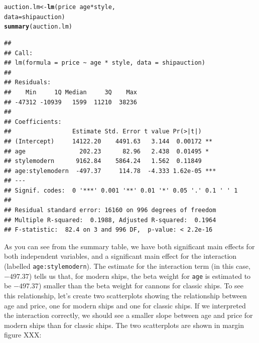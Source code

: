 \documentclass{tufte-book}\usepackage[]{graphicx}\usepackage[]{color}
\makeatletter
\newcommand{\hlopt}[1]{\textcolor[rgb]{0,0,0}{#1}}%
\newcommand{\hlstd}[1]{\textcolor[rgb]{0.345,0.345,0.345}{#1}}%
\newcommand{\hlkwb}[1]{\textcolor[rgb]{0.69,0.353,0.396}{#1}}%
\newcommand{\hlkwc}[1]{\textcolor[rgb]{0.333,0.667,0.333}{#1}}%
\newcommand{\hlkwd}[1]{\textcolor[rgb]{0.737,0.353,0.396}{\textbf{#1}}}%
\newenvironment{kframe}{%
 \def\at@end@of@kframe{}%
 \ifinner\ifhmode%
  \def\at@end@of@kframe{\end{minipage}}%
  \begin{minipage}{\columnwidth}%
 \fi\fi%
 \def\FrameCommand##1{\hskip\@totalleftmargin \hskip-\fboxsep
 \colorbox{shadecolor}{##1}\hskip-\fboxsep
     \hskip-\linewidth \hskip-\@totalleftmargin \hskip\columnwidth}%
 \MakeFramed {\advance\hsize-\width
   \@totalleftmargin\z@ \linewidth\hsize
   \@setminipage}}%
 {\par\unskip\endMakeFramed%
 \at@end@of@kframe}
\newenvironment{knitrout}{}{} %
\makeatother
\begin{document}
\begin{knitrout}
\color{fgcolor}\begin{kframe}
\begin{alltt}
\hlstd{auction.lm} \hlkwb{<-} \hlkwd{lm}\hlstd{(price} \hlopt{~} \hlstd{age} \hlopt{*} \hlstd{style,}
                 \hlkwc{data} \hlstd{= shipauction)}
\hlkwd{summary}\hlstd{(auction.lm)}
\end{alltt}
\begin{verbatim}
## 
## Call:
## lm(formula = price ~ age * style, data = shipauction)
## 
## Residuals:
##    Min     1Q Median     3Q    Max 
## -47312 -10939   1599  11210  38236 
## 
## Coefficients:
##                 Estimate Std. Error t value Pr(>|t|)    
## (Intercept)     14122.20    4491.63   3.144  0.00172 ** 
## age               202.23      82.96   2.438  0.01495 *  
## stylemodern      9162.84    5864.24   1.562  0.11849    
## age:stylemodern  -497.37     114.78  -4.333 1.62e-05 ***
## ---
## Signif. codes:  0 '***' 0.001 '**' 0.01 '*' 0.05 '.' 0.1 ' ' 1
## 
## Residual standard error: 16160 on 996 degrees of freedom
## Multiple R-squared:  0.1988,	Adjusted R-squared:  0.1964 
## F-statistic:  82.4 on 3 and 996 DF,  p-value: < 2.2e-16
\end{verbatim}
\end{kframe}
\end{knitrout}

As you can see from the summary table, we have both significant main effects for both independent variables, and a significant main effect for the interaction (labelled \texttt{age:stylemodern}). The estimate for the interaction term (in this case, \ensuremath{-497.37}) tells us that, for modern ships, the beta weight for \texttt{age} is estimated to be \ensuremath{-497.37}) smaller than the beta weight for cannons for classic ships. To see this relationship, let's create two scatterplots showing the relationship between age and price, one for modern ships and one for classic ships. If we interpreted the interaction correctly, we should see a smaller slope between age and price for modern ships than for classic ships. The two scatterplots are shown in margin figure XXX:
\end{document}
